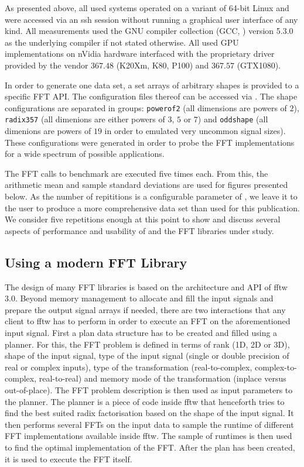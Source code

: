 As presented above, all used systems operated on a variant of 64-bit Linux and were accessed via an ssh session without running a graphical user interface of any kind. All measurements used the GNU compiler collection (GCC, \cite{stallman2001using}) version 5.3.0 as the underlying compiler if not stated otherwise. All used GPU implementations on nVidia hardware interfaced with the proprietary driver provided by the vendor $367.48$ (K20Xm, K80, P100) and $367.57$ (GTX1080). 

In order to generate one data set, a set arrays of arbitrary shapes is provided to a specific FFT API. The configuration files thereof can be accessed via \cite{gearshifft_github}. The shape configurations are separated in groups: \texttt{powerof2} (all dimensions are powers of $2$), \texttt{radix357} (all dimenions are either powers of $3$, $5$ or $7$) and \texttt{oddshape} (all dimenions are powers of $19$ in order to emulated very uncommon signal sizes). These configurations were generated in order to probe the FFT implementations for a wide spectrum of possible applications.  

The FFT calls to benchmark are executed five times each. From this, the arithmetic mean and sample standard deviations are used for figures presented below. As the number of repititions is a configurable parameter of \gearshifft{}, we leave it to the user to produce a more comprehensive data set than used for this publication. We consider five repetitions enough at this point to show and discuss several aspects of performance and usability of \gearshifft{} and the FFT libraries under study.  

\subsection{Using a modern FFT Library}
\label{ssec:modern_ffts}

The design of many FFT libraries is based on the architecture and API of fftw $3.0$. Beyond memory management to allocate and fill the input signals and prepare the output signal arrays if needed, there are two interactions that any client to fftw has to perform in order to execute an FFT on the aforementioned input signal. First a plan data structure has to be created and filled using a planner. For this, the FFT problem is defined in terms of rank (1D, 2D or 3D), shape of the input signal, type of the input signal (single or double precision of real or complex inputs), type of the transformation (real-to-complex, complex-to-complex, real-to-real) and memory mode of the transformation (inplace versus out-of-place). The FFT problem description is then used as input parameters to the planner. The planner is a piece of code inside fftw that henceforth tries to find the best suited radix factorisation based on the shape of the input signal. It then performs several FFTs on the input data to sample the runtime of different FFT implementations available inside fftw. The sample of runtimes is then used to find the optimal implementation of the FFT. After the plan has been created, it is used to execute the FFT itself.

